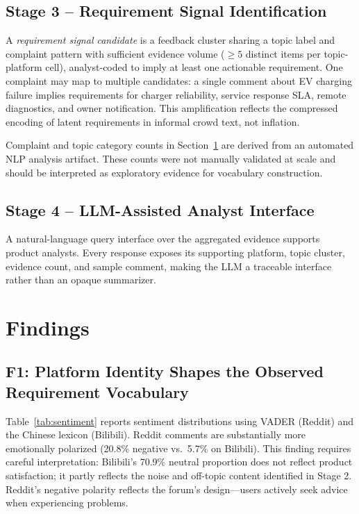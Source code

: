 \documentclass[conference]{IEEEtran}
\begin{document}
\subsection{Stage 3 -- Requirement Signal Identification}

A \textit{requirement signal candidate} is a feedback cluster sharing a topic label and complaint pattern with sufficient evidence volume (${\geq}5$ distinct items per topic-platform cell), analyst-coded to imply at least one actionable requirement. One complaint may map to multiple candidates: a single comment about EV charging failure implies requirements for charger reliability, service response SLA, remote diagnostics, and owner notification. This amplification reflects the compressed encoding of latent requirements in informal crowd text, not inflation.

Complaint and topic category counts in Section~\ref{sec:findings} are derived from an automated NLP analysis artifact. These counts were not manually validated at scale and should be interpreted as exploratory evidence for vocabulary construction.

\subsection{Stage 4 -- LLM-Assisted Analyst Interface}

A natural-language query interface over the aggregated evidence supports product analysts. Every response exposes its supporting platform, topic cluster, evidence count, and sample comment, making the LLM a traceable interface rather than an opaque summarizer.

\section{Findings}
\label{sec:findings}

\subsection{F1: Platform Identity Shapes the Observed Requirement Vocabulary}

Table~\ref{tab:sentiment} reports sentiment distributions using VADER (Reddit) and the Chinese lexicon (Bilibili). Reddit comments are substantially more emotionally polarized (20.8\% negative vs.\ 5.7\% on Bilibili). This finding requires careful interpretation: Bilibili's 70.9\% neutral proportion does not reflect product satisfaction; it partly reflects the noise and off-topic content identified in Stage 2. Reddit's negative polarity reflects the forum's design---users actively seek advice when experiencing problems.
\end{document}
